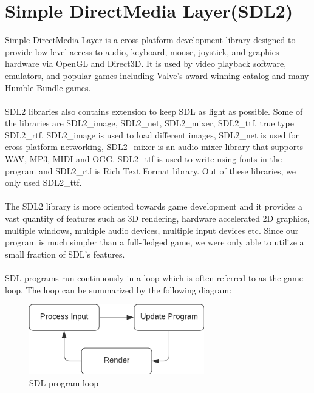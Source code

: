 \documentclass[report]{subfiles}
\begin{document}
    \section{Simple DirectMedia Layer(SDL2)}
    Simple DirectMedia Layer is a cross-platform development library designed to provide
    low level access to audio, keyboard, mouse, joystick, and graphics hardware
    via OpenGL and Direct3D. It is used by video playback software, emulators, and
    popular games including Valve’s award winning catalog and many Humble Bundle
    games.\\\\
    SDL2 libraries also contains extension to keep SDL as light as possible. Some of the
    libraries are SDL2\_image, SDL2\_net, SDL2\_mixer, SDL2\_ttf, true type SDL2\_rtf. SDL2\_image
    is used to load different images, SDL2\_net is used for cross platform networking,
    SDL2\_mixer is an audio mixer library that supports WAV, MP3, MIDI and OGG.
    SDL2\_ttf is used to write using fonts in the program and SDL2\_rtf is Rich Text Format
    library. Out of these libraries, we only used SDL2\_ttf.
    \\\\
    The SDL2 library is more oriented towards game development and it provides a vast quantity of features such as 3D rendering, hardware accelerated 2D graphics, multiple windows, multiple audio devices, multiple input devices etc. 
    Since our program is much simpler than a full-fledged game, we were only able to utilize a small fraction of SDL's features.
    \\\\
    SDL programs run continuously in a loop which is often referred to as the game loop. The loop can be summarized by the following diagram:
    \begin{figure}[H]
        \centering
        \includegraphics[width=3in]{graphics/SDL_loop.png}
        \caption{SDL program loop}
    \end{figure}
\end{document}
